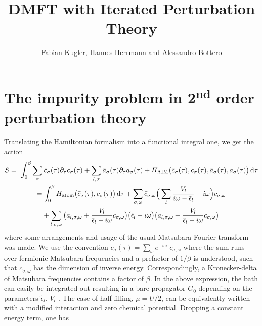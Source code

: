 \documentclass[11pt]{article}
\title{DMFT with Iterated Perturbation Theory}
\author{Fabian Kugler, Hannes Herrmann and Alessandro Bottero}
\begin{document}
\maketitle


\section{The impurity problem in 2\textsuperscript{nd} order perturbation theory}
\label{sec_impsolv}

Translating the Hamiltonian formalism into a functional integral one, we get the action
%
\begin{gather*}
S = \
	\int_0^{\beta} \sum_{\sigma} \bar{c}_{\sigma} (\tau) \partial_{\tau} c_{\sigma} (\tau) 
	+ \sum_{l, \sigma} \bar{a}_{\sigma} (\tau) \partial_{\tau} a_{\sigma} (\tau)
	+ H_{\text{AIM}} \big( \bar{c}_{\sigma} (\tau), c_{\sigma} (\tau), \bar{a}_{\sigma} (\tau), a_{\sigma} (\tau) \big)
	\dif \tau
	\\
	 = \int_0^{\beta}  H_{\text{atom}} \big( \bar{c}_{\sigma} (\tau), c_{\sigma} (\tau) \big)  \dif \tau 
	+ \sum_{\sigma, \omega} \bar{c}_{\sigma, \omega} 
	\Big( \sum_{l} \frac{V_l}{i\omega - \tilde{\epsilon}_l} - i\omega \Big)
	c_{\sigma, \omega} 
	\\
	+ \sum_{l, \sigma, \omega} \big( \bar{a}_{l, \sigma, \omega} + \frac{V_l}{\tilde{\epsilon}_l - i\omega} \bar{c}_{\sigma, \omega} \big) 
	\big( \tilde{\epsilon_l} - i\omega \big)
	\big( a_{l, \sigma, \omega} + \frac{V_l}{\tilde{\epsilon}_l - i\omega} c_{\sigma, \omega} \big) 
\end{gather*}
%
where some arrangements and usage of the usual Matsubara-Fourier transform was made. We use the convention
$
c_{\sigma} (\tau) = \sum_{\omega} e^{-i\omega \tau} c_{\sigma, \omega}
$
where the sum runs over fermionic Matsubara frequencies and a prefactor of $1/ \beta$ is understood, such that $c_{\sigma, \omega}$ has the dimension of inverse energy. Correspondingly, a Kronecker-delta of Matsubara frequencies contains a factor of $\beta$. In the above expression, the bath can easily be integrated out resulting in a bare propagator $G_0$ depending on the parameters $\tilde{\epsilon}_l$, $V_l$ . The case of half filling, $\mu = U/2$, can be equivalently written with a modified interaction and zero chemical potential. Dropping a constant energy term, one has
\end{document}
